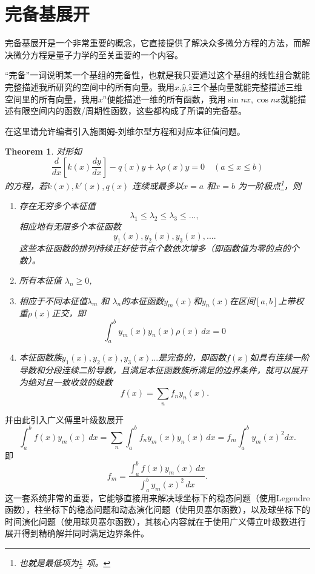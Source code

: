 \documentclass[12pt,a4paper,openany,twoside]{book}
\newtheorem{theorem}{Theorem}[section]
\numberwithin{equation}{section}
\begin{document}
    \section{完备基展开}
    完备基展开是一个非常重要的概念，它直接提供了解决众多微分方程的方法，而解决微分方程是量子力学的至关重要的一个内容。

    ``完备''一词说明某一个基组的完备性，也就是我只要通过这个基组的线性组合就能完整描述我所研究的空间中的所有向量。我用$\hat{x}$,$\hat{y}$,$\hat{z}$三个基向量就能完整描述三维空间里的所有向量，我用${x^n}$便能描述一维的所有函数，我用${\sin{nx},\cos{nx}}$就能描述有限空间内的函数/周期性函数，这些都构成了所谓的完备基。

    在这里请允许编者引入施图姆-刘维尔型方程和对应本征值问题。
    \begin{theorem}
    	对形如
	\begin{equation}
		\frac{d }{d x} \left[ k(x) \frac{d y}{d x}  \right] -q(x)y + \lambda \rho(x) y = 0 \quad (a\leqslant x \leqslant b)
	\end{equation}
	的方程，若$k(x),k'(x),q(x)$ 连续或最多以$x=a$ 和$x=b$ 为一阶极点\footnote{也就是最低项为$\frac{1}{x}$ 项。}，则
	\begin{enumerate}
		\item 存在无穷多个本征值
		\[
		\lambda_1 \leqslant \lambda_2 \leqslant \lambda_3 \leqslant ...
		,\] 
		相应地有无限多个本征函数
		\[
			y_1(x),y_2(x),y_3(x),...
		.\] 
		这些本征函数的排列持续正好使节点个数依次增多（即函数值为零的点的个数）。
		\item 所有本征值 $\lambda_n \geqslant 0$,
		\item 相应于不同本征值$\lambda_m$ 和 $\lambda_n$的本征函数$y_m(x)$和$y_n(x)$在区间$[a,b]$上带权重$\rho(x)$正交，即
			\begin{equation}
				\int ^b_a y_m(x) y_n(x) \rho(x) \, dx = 0 
			\end{equation}
		\item 本征函数族$y_1(x),y_2(x),y_3(x)...$是完备的，即函数$f(x)$如具有连续一阶导数和分段连续二阶导数，且满足本征函数族所满足的边界条件，就可以展开为绝对且一致收敛的级数
			\[
				f(x) = \sum_n f_n y_n(x)
			.\] 
	\end{enumerate}
    \end{theorem}
    并由此引入广义傅里叶级数展开
    \[
	    \int ^b_a f(x) y_m(x) \, dx = \sum_n \int^b_a f_n y_m(x)y_n(x) \, dx = f_m \int^b_a y_m(x)^2 dx   
    .\] 
    即
    \[
	    f_m = \frac{\int ^b_a f(x) y_m(x) \, dx }{\int^b_a y_m(x)^2 \, dx }
    .\] 
    这一套系统非常的重要，它能够直接用来解决球坐标下的稳态问题（使用Legendre函数），柱坐标下的稳态问题和动态演化问题（使用贝塞尔函数），以及球坐标下的时间演化问题（使用球贝塞尔函数），其核心内容就在于使用广义傅立叶级数进行展开得到精确解并同时满足边界条件。
\end{document}
